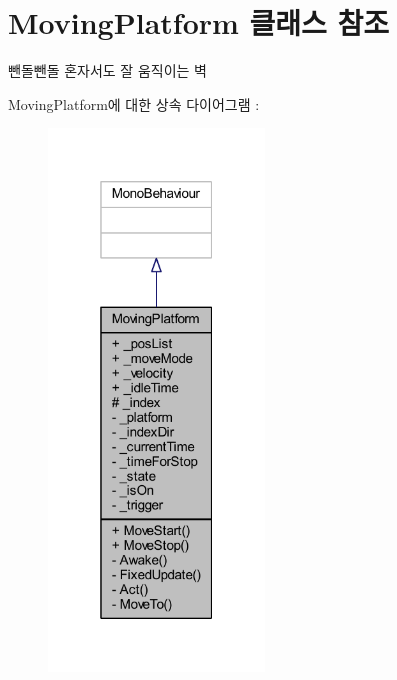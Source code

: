 \hypertarget{class_moving_platform}{}\section{Moving\+Platform 클래스 참조}
\label{class_moving_platform}


뺀돌뺀돌 혼자서도 잘 움직이는 벽  




Moving\+Platform에 대한 상속 다이어그램 \+: \nopagebreak
\begin{figure}[H]
\begin{center}
\leavevmode
\includegraphics[width=163pt]{d8/ddd/class_moving_platform__inherit__graph}
\end{center}
\end{figure}



